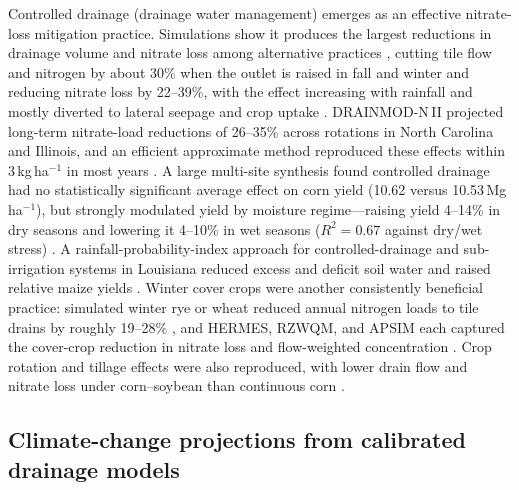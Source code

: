 \documentclass[11pt]{article}
\begin{document}
Controlled drainage (drainage water management) emerges as an effective nitrate-loss mitigation practice. Simulations show it produces the largest reductions in drainage volume and nitrate loss among alternative practices \parencite{Luo2010,Ma2007b}, cutting tile flow and nitrogen by about 30\% when the outlet is raised in fall and winter \parencite{Ahuja2007} and reducing nitrate loss by 22--39\%, with the effect increasing with rainfall and mostly diverted to lateral seepage and crop uptake \parencite{Fang2012,Negm2017}. DRAINMOD-N\,II projected long-term nitrate-load reductions of 26--35\% across rotations in North Carolina and Illinois, and an efficient approximate method reproduced these effects within 3\,kg\,ha$^{-1}$ in most years \parencite{Skaggs2012,Negm2016}. A large multi-site synthesis found controlled drainage had no statistically significant average effect on corn yield (10.62 versus 10.53\,Mg\,ha$^{-1}$), but strongly modulated yield by moisture regime---raising yield 4--14\% in dry seasons and lowering it 4--10\% in wet seasons ($R^2 = 0.67$ against dry/wet stress) \parencite{Youssef2023}. A rainfall-probability-index approach for controlled-drainage and sub-irrigation systems in Louisiana reduced excess and deficit soil water and raised relative maize yields \parencite{COOPER1988}. Winter cover crops were another consistently beneficial practice: simulated winter rye or wheat reduced annual nitrogen loads to tile drains by roughly 19--28\% \parencite{Singer2011}, and HERMES, RZWQM, and APSIM each captured the cover-crop reduction in nitrate loss and flow-weighted concentration \parencite{Malone2017,Gillette2018,Malone2007c}. Crop rotation and tillage effects were also reproduced, with lower drain flow and nitrate loss under corn--soybean than continuous corn \parencite{Ma2007b,Malone2007c}.

\subsection{Climate-change projections from calibrated drainage models}
\end{document}
